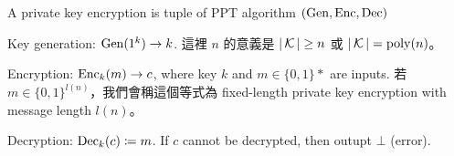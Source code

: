 \begin{definition}
	A private key encryption is tuple of PPT algorithm \((\operatorname{Gen}, \operatorname{Enc}, \operatorname{Dec})\) \\
	\begin{myItemize}
		\item Key generation: \(\operatorname{Gen}(1^k) \rightarrow k\). 這裡 \(n\) 的意義是 \(|\operatorname{\mathcal{K}}| \geq n\) 或 \(|\operatorname{\mathcal{K}}| = \mathrm{poly}(n)\)。
		
		\item Encryption: \(\operatorname{Enc}_k(m) \rightarrow c\), where key \(k\) and \(m \in \{0, 1\}*\) are inputs. 若 \(m \in \{0, 1\}^{l(n)}\)，我們會稱這個等式為 fixed-length private key encryption with message length \(l(n)\)。
		
		\item Decryption: \(\operatorname{Dec}_k(c) \coloneq m\). If \(c\) cannot be decrypted, then outupt \(\bot\) (error). 
	\end{myItemize}
\end{definition}
























